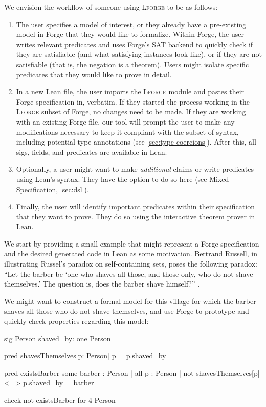 We envision the workflow of someone using \textsc{Lforge} to be as follows: 
\begin{enumerate}
    \item The user specifies a model of interest, or they already have a pre-existing model in Forge that they would like to formalize. Within Forge, the user writes relevant predicates and uses Forge's SAT backend to quickly check if they are satisfiable (and what satisfying instances look like), or if they are not satisfiable (that is, the negation is a theorem). Users might isolate specific predicates that they would like to prove in detail. 
    \item In a new Lean file, the user imports the \textsc{Lforge} module and pastes their Forge specification in, verbatim. If they started the process working in the \textsc{Lforge} subset of Forge, no changes need to be made. If they are working with an existing Forge file, our tool will prompt the user to make any modifications necessary to keep it compliant with the subset of syntax, including potential type annotations (see \cref{sec:type-coercions}). After this, all sigs, fields, and predicates are available in Lean. 
    \item Optionally, a user might want to make \emph{additional} claims or write predicates using Lean's syntax. They have the option to do so here (see Mixed Specification, \cref{sec:dsl}). 
    \item Finally, the user will identify important predicates within their specification that they want to prove. They do so using the interactive theorem prover in Lean. 
\end{enumerate}

We start by providing a small example that might represent a Forge specification and the desired generated code in Lean as some motivation. Bertrand Russell, in illustrating Russel's paradox on self-containing sets, poses the following paradox: ``Let the barber be `one who shaves all those, and those only, who do not shave themselves.' The question is, does the barber shave himself?'' \cite[101]{russell2009philosophy}. 

We might want to construct a formal model for this village for which the barber shaves all those who do not shave themselves, and use Forge to prototype and quickly check properties regarding this model: 

\begin{forge*}
sig Person {
  shaved_by: one Person
}

pred shavesThemselves[p: Person] {
  p = p.shaved_by
}

pred existsBarber {
  some barber : Person | all p : Person | {
    not shavesThemselves[p] <=> p.shaved_by = barber
  }
}

check { not existsBarber } for 4 Person
\end{forge*}

